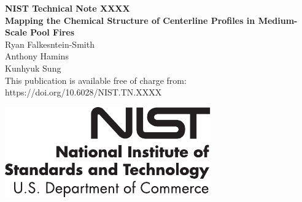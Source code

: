 \documentclass[12pt]{article}
\newcommand{\pubnumber}{XXXX}
\newcommand{\DOI}{https://doi.org/10.6028/NIST.TN.XXXX}
\begin{document}
	
	\begin{titlepage}
		\begin{flushright}
\LARGE{\textbf{NIST Technical Note \pubnumber}}\\
\vfill
\Huge{\textbf{Mapping the Chemical Structure of Centerline Profiles in Medium-Scale Pool Fires}}\\
\vfill
\large Ryan Falkesntein-Smith\\
\large Anthony Hamins\\
\large Kunhyuk Sung\\
\vfill
\normalsize This publication is available free of charge from:\\
\DOI\\
\vfill

\includegraphics[width=0.3\linewidth]{NIST-logo}\\


\end{flushright}
\end{titlepage}
\end{document}
